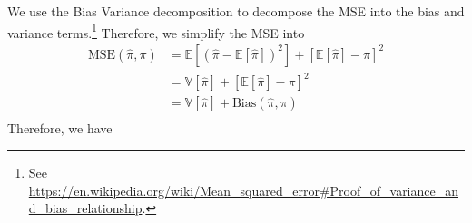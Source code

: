 We use the Bias Variance decomposition to decompose the MSE into the bias and variance terms.\!\footnote{See \url{https://en.wikipedia.org/wiki/Mean_squared_error\#Proof_of_variance_and_bias_relationship}.}
Therefore, we simplify the MSE into 
\begin{align*}
    \text{MSE}(\hat{\pi}, \pi) &= \mathbb{E}\left[ {\left( \hat{\pi} - \mathbb{E}[\hat{\pi}] \right)}^2 \right] + {\left[ \mathbb{E}[\hat{\pi}] - \pi \right]}^2 \\
    &= \mathbb{V}\left[ \hat{\pi} \right] + {\left[ \mathbb{E}[\hat{\pi}] - \pi \right]}^2 \\
    &= \mathbb{V}\left[ \hat{\pi} \right] + \text{Bias}(\hat{\pi}, \pi) \\
\end{align*}
Therefore, we have
